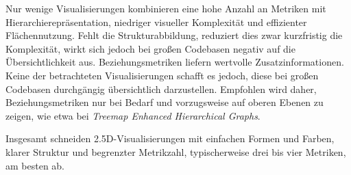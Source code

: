Nur wenige Visualisierungen kombinieren eine hohe Anzahl an Metriken mit Hierarchierepräsentation, niedriger visueller Komplexität und effizienter Flächennutzung. Fehlt die Strukturabbildung, reduziert dies zwar kurzfristig die Komplexität, wirkt sich jedoch bei großen Codebasen negativ auf die Übersichtlichkeit aus. Beziehungsmetriken liefern wertvolle Zusatzinformationen. Keine der betrachteten Visualisierungen schafft es jedoch, diese bei großen Codebasen durchgängig übersichtlich darzustellen. Empfohlen wird daher, Beziehungsmetriken nur bei Bedarf und vorzugsweise auf oberen Ebenen zu zeigen, wie etwa bei \textit{Treemap Enhanced Hierarchical Graphs}.

Insgesamt schneiden 2{.}5D-Visualisierungen mit einfachen Formen und Farben, klarer Struktur und begrenzter Metrikzahl, typischerweise drei bis vier Metriken, am besten ab.